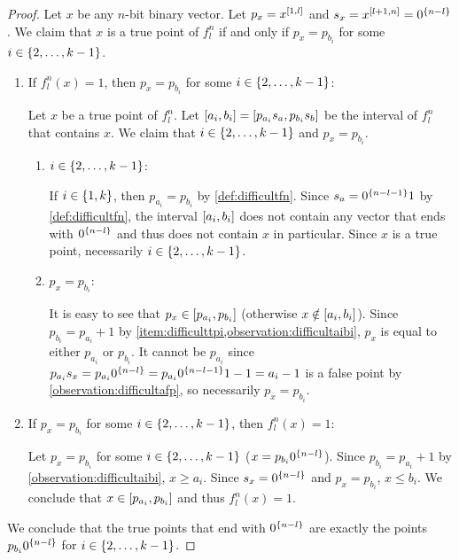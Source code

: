 \begin{proof}
Let $x$ be any $n$-bit binary vector.
Let $p_x = x^{[1, l]}$
and $s_x = x^{[l+1, n]} = 0^{\{n-l\}}$.
We claim that $x$ is a true point of $f_l^n$
if and only if
$p_x = p_{b_i}$ for some $i \in \{2, \ldots, k-1\}$.

\begin{enumerate}
\item If $f_l^n(x) = 1$,
then $p_x = p_{b_i}$
for some $i \in \{2, \ldots, k-1\}$:

Let $x$ be a true point of $f_l^n$.
Let $[a_i, b_i]
= [p_{a_i} s_a, p_{b_i} s_b]$
be the interval of $f_l^n$ that contains $x$.
We claim that $i \in \{2, \ldots, k-1\}$
and $p_x = p_{b_i}$.

\begin{enumerate}
\item $i \in \{2, \ldots, k-1\}$:
\label{item:difficulttpi}

If $i \in \{1, k\}$,
then $p_{a_i} = p_{b_i}$ by \cref{def:difficultfn}.
Since $s_a = 0^{\{n-l-1\}} 1$
by \cref{def:difficultfn},
the interval $[a_i, b_i]$
does not contain any vector
that ends with $0^{\{n-l\}}$
and thus does not contain $x$ in particular.
Since $x$ is a true point,
necessarily $i \in \{2, \ldots, k-1\}$.

\item $p_x = p_{b_i}$:

It is easy to see that
$p_x \in [p_{a_i}, p_{b_i}]$
(otherwise $x \notin [a_i, b_i]$).
Since $p_{b_i} = p_{a_i} + 1$
by \cref{item:difficulttpi,observation:difficultaibi},
$p_x$ is equal to either $p_{a_i}$ or $p_{b_i}$.
It cannot be $p_{a_i}$
since $p_{a_i} s_x
= p_{a_i} 0^{\{n-l\}}
= p_{a_i} 0^{\{n-l-1\}} 1 - 1
= a_i - 1$
is a false point
by \cref{observation:difficultafp},
so necessarily $p_x = p_{b_i}$.
\end{enumerate}

\item If $p_x = p_{b_i}$
for some $i \in \{2, \ldots, k-1\}$,
then $f_l^n(x) = 1$:

Let $p_x = p_{b_i}$
for some $i \in \{2, \ldots, k-1\}$
($x = p_{b_i} 0^{\{n-l\}}$).
Since $p_{b_i} = p_{a_i} + 1$
by \cref{observation:difficultaibi},
$x \geq a_i$.
Since $s_x = 0^{\{n-l\}}$ and $p_x = p_{b_i}$,
$x \leq b_i$.
We conclude that $x \in [p_{a_i}, p_{b_i}]$
and thus $f_l^n(x) = 1$.
\end{enumerate}

We conclude that the true points that end with $0^{\{n-l\}}$
are exactly the points $p_{b_i} 0^{\{n-l\}}$
for $i \in \{2, \ldots, k-1\}$.
\end{proof}

